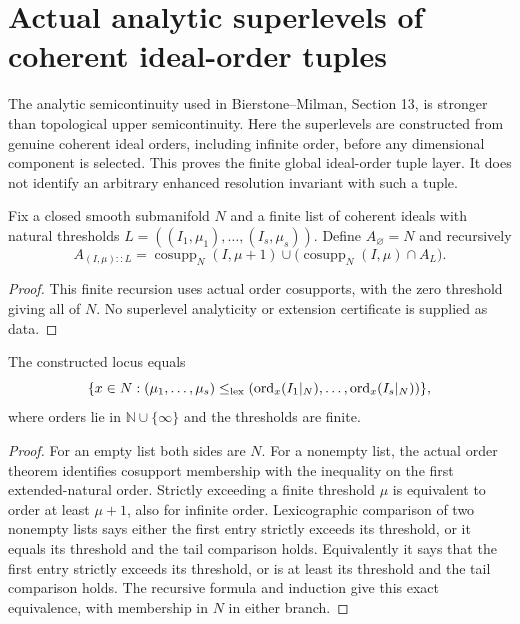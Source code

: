 \section{Actual analytic superlevels of coherent ideal-order tuples}

The analytic semicontinuity used in Bierstone--Milman\cite{bierstone-milman97-invent-math},
Section 13, is stronger than topological upper semicontinuity. Here the
superlevels are constructed from genuine coherent ideal orders, including
infinite order, before any dimensional component is selected. This proves
the finite global ideal-order tuple layer. It does not identify an arbitrary
enhanced resolution invariant with such a tuple.

\begin{definition}
\label{hir:actual-lex-order-locus}
\leanok
Fix a closed smooth submanifold $N$ and a finite list of coherent ideals
with natural thresholds $L=((I_1,\mu_1),\ldots,(I_s,\mu_s))$.
Define $A_\varnothing=N$ and recursively
\[
 A_{(I,\mu)::L}=\operatorname{cosupp}_N(I,\mu+1)
 \cup\bigl(\operatorname{cosupp}_N(I,\mu)\cap A_L\bigr).
\]
\end{definition}
\begin{proof}
This finite recursion uses actual order cosupports, with the zero threshold
giving all of $N$. No superlevel analyticity or extension certificate is
supplied as data.
\end{proof}

\begin{lemma}
\label{hir:actual-lex-order-dictionary}
\leanok
The constructed locus equals
\[
 \{x\in N:(\mu_1,\ldots,\mu_s)\le_{\rm lex}
 (\operatorname{ord}_x(I_1|_N),\ldots,\operatorname{ord}_x(I_s|_N))\},
\]
where orders lie in $\mathbb N\cup\{\infty\}$ and the thresholds are finite.
\end{lemma}
\begin{proof}
For an empty list both sides are $N$. For a nonempty list, the actual
order theorem identifies cosupport membership with the inequality on
the first extended-natural order. Strictly exceeding a finite threshold
$\mu$ is equivalent to order at least $\mu+1$, also for infinite order.
Lexicographic comparison of two nonempty lists says either the first
entry strictly exceeds its threshold, or it equals its threshold and
the tail comparison holds. Equivalently it says that the first entry
strictly exceeds its threshold, or is at least its threshold and the
tail comparison holds. The recursive formula and induction give this
exact equivalence, with membership in $N$ in either branch.
\end{proof}

